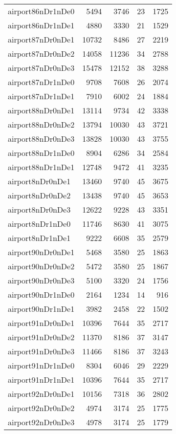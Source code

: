 \begin{tabular}{lrrrr}
airport86nDr1nDe0 & 5494 & 3746 & 23 & 1725 \\
airport86nDr1nDe1 & 4880 & 3330 & 21 & 1529 \\
airport87nDr0nDe1 & 10732 & 8486 & 27 & 2219 \\
airport87nDr0nDe2 & 14058 & 11236 & 34 & 2788 \\
airport87nDr0nDe3 & 15478 & 12152 & 38 & 3288 \\
airport87nDr1nDe0 & 9708 & 7608 & 26 & 2074 \\
airport87nDr1nDe1 & 7910 & 6002 & 24 & 1884 \\
airport88nDr0nDe1 & 13114 & 9734 & 42 & 3338 \\
airport88nDr0nDe2 & 13794 & 10030 & 43 & 3721 \\
airport88nDr0nDe3 & 13828 & 10030 & 43 & 3755 \\
airport88nDr1nDe0 & 8904 & 6286 & 34 & 2584 \\
airport88nDr1nDe1 & 12748 & 9472 & 41 & 3235 \\
airport8nDr0nDe1 & 13460 & 9740 & 45 & 3675 \\
airport8nDr0nDe2 & 13438 & 9740 & 45 & 3653 \\
airport8nDr0nDe3 & 12622 & 9228 & 43 & 3351 \\
airport8nDr1nDe0 & 11746 & 8630 & 41 & 3075 \\
airport8nDr1nDe1 & 9222 & 6608 & 35 & 2579 \\
airport90nDr0nDe1 & 5468 & 3580 & 25 & 1863 \\
airport90nDr0nDe2 & 5472 & 3580 & 25 & 1867 \\
airport90nDr0nDe3 & 5100 & 3320 & 24 & 1756 \\
airport90nDr1nDe0 & 2164 & 1234 & 14 & 916 \\
airport90nDr1nDe1 & 3982 & 2458 & 22 & 1502 \\
airport91nDr0nDe1 & 10396 & 7644 & 35 & 2717 \\
airport91nDr0nDe2 & 11370 & 8186 & 37 & 3147 \\
airport91nDr0nDe3 & 11466 & 8186 & 37 & 3243 \\
airport91nDr1nDe0 & 8304 & 6046 & 29 & 2229 \\
airport91nDr1nDe1 & 10396 & 7644 & 35 & 2717 \\
airport92nDr0nDe1 & 10156 & 7318 & 36 & 2802 \\
airport92nDr0nDe2 & 4974 & 3174 & 25 & 1775 \\
airport92nDr0nDe3 & 4978 & 3174 & 25 & 1779 \\

\end{tabular}
